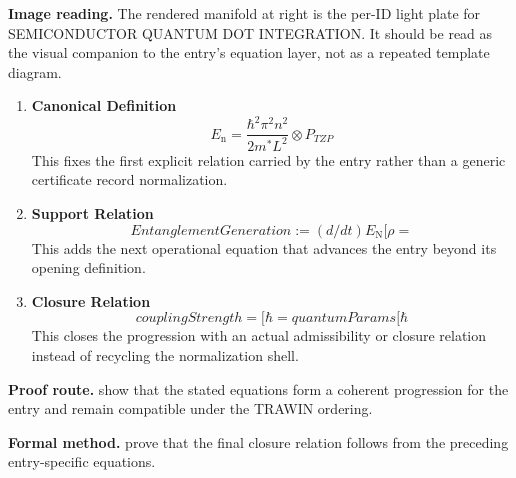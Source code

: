 \begin{samepage}
\noindent\begin{minipage}[t]{0.45\linewidth}
\vspace{0pt}
\raggedright
\scriptsize\textbf{Image reading.} The rendered manifold at right is the per-ID light plate for SEMICONDUCTOR QUANTUM DOT INTEGRATION. It should be read as the visual companion to the entry's equation layer, not as a repeated template diagram.\par
\end{minipage}\hfill
\begin{minipage}[t]{0.53\linewidth}
\vspace*{-0.10in}
\raggedright
{}
\end{minipage}
\end{samepage}

\clearpage


\begin{enumerate}[leftmargin=1.6em,itemsep=9pt,topsep=6pt]
\item \textbf{Canonical Definition}
\[
E_{\mathrm{n}} = \frac{\hbar^2 \pi^2 n^2}{2m^* L^2} \otimes P_{TZP}
\]
This fixes the first explicit relation carried by the entry rather than a generic certificate record normalization.

\item \textbf{Support Relation}
\[
EntanglementGeneration := (d/dt) E_{\mathrm{N}}[\rho =
\]
This adds the next operational equation that advances the entry beyond its opening definition.

\item \textbf{Closure Relation}
\[
couplingStrength = [{\hbar = quantumParams[\hbar}
\]
This closes the progression with an actual admissibility or closure relation instead of recycling the normalization shell.
\end{enumerate}

\textbf{Proof route.} show that the stated equations form a coherent progression for the entry and remain compatible under the TRAWIN ordering.

\textbf{Formal method.} prove that the final closure relation follows from the preceding entry-specific equations.

\medskip
{}

